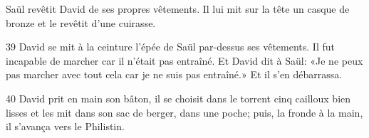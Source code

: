 Saül revêtit David de ses propres vêtements. Il lui mit sur la tête un casque de bronze et le revêtit d’une cuirasse.

39 David se mit à la ceinture l’épée de Saül par-dessus ses vêtements. Il fut incapable de marcher car il n’était pas entraîné. Et David dit à Saül: «Je ne peux pas marcher avec tout cela car je ne suis pas entraîné.» Et il s’en débarrassa.

40 David prit en main son bâton, il se choisit dans le torrent cinq cailloux bien lisses et les mit dans son sac de berger, dans une poche; puis, la fronde à la main, il s’avança vers le Philistin.
